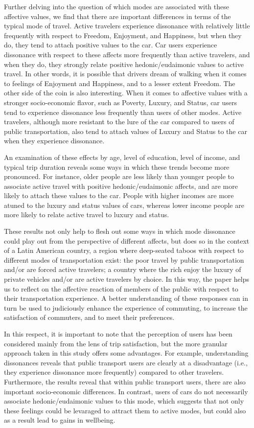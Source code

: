 \documentclass[]{elsarticle} %
\begin{document}
Further delving into the question of which modes are associated with
these affective values, we find that there are important differences in
terms of the typical mode of travel. Active travelers experience
dissonance with relatively little frequently with respect to Freedom,
Enjoyment, and Happiness, but when they do, they tend to attach positive
values to the car. Car users experience dissonance with respect to these
affects more frequently than active travelers, and when they do, they
strongly relate positive hedonic/eudaimonic values to active travel. In
other words, it is possible that drivers dream of walking when it comes
to feelings of Enjoyment and Happiness, and to a lesser extent Freedom.
The other side of the coin is also interesting. When it comes to
affective values with a stronger socio-economic flavor, such as Poverty,
Luxury, and Status, car users tend to experience dissonance less
frequently than users of other modes. Active travelers, although more
resistant to the lure of the car compared to users of public
transportation, also tend to attach values of Luxury and Status to the
car when they experience dissonance.

An examination of these effects by age, level of education, level of
income, and typical trip duration reveals some ways in which these
trends become more pronounced. For instance, older people are less
likely than younger people to associate active travel with positive
hedonic/eudaimonic affects, and are more likely to attach these values
to the car. People with higher incomes are more atuned to the luxury and
status values of cars, whereas lower income people are more likely to
relate active travel to luxury and status.

These results not only help to flesh out some ways in which mode
dissonance could play out from the perspective of different affects, but
does so in the context of a Latin American country, a region where
deep-seated taboos with respect to different modes of transportation
exist: the poor travel by public transportation and/or are forced active
travelers; a country where the rich enjoy the luxury of private vehicles
and/or are active travelers by choice. In this way, the paper helps us
to reflect on the affective reaction of members of the public with
respect to their transportation experience. A better understanding of
these responses can in turn be used to judiciously enhance the
experience of commuting, to increase the satisfaction of commuters, and
to meet their preferences.

In this respect, it is important to note that the perception of users
has been considered mainly from the lens of trip satisfaction, but the
more granular approach taken in this study offers some advantages. For
example, understanding dissonances reveals that public transport users
are clearly at a disadvantage (i.e., they experience dissonance more
frequently) compared to other travelers. Furthermore, the results reveal
that within public transport users, there are also important
socio-economic differences. In contrast, users of cars do not
necessarily associate hedonic/eudaimonic values to this mode, which
suggests that not only these feelings could be levaraged to attract them
to active modes, but could also as a result lead to gains in wellbeing.
\end{document}

